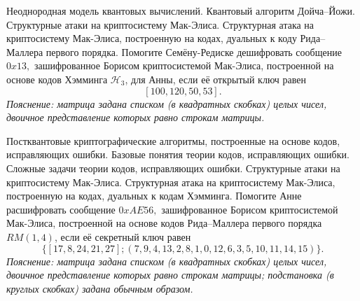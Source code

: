 \begin{questions}
    \question
        Неоднородная модель квантовых вычислений. Квантовый алгоритм Дойча--Йожи.
    \question
        Структурные атаки на криптосистему Мак-Элиса.
        Структурная атака на криптосистему Мак-Элиса, построенную на кодах, дуальных к коду Рида--Маллера первого порядка.
    \question
        Помогите Семёну-Редиске дешифровать сообщение \(0x13,\) зашифрованное Борисом криптосистемой Мак-Элиса, построенной на основе кодов Хэмминга \(\mathcal{H}_3\), для Анны, если её открытый ключ равен 
        \[[100, 120, 50, 53].\]
        \emph{Пояснение: матрица задана списком (в квадратных скобках) целых чисел, двоичное представление которых равно строкам матрицы.}
\end{questions}


\begin{questions}
    \question
        Постквантовые криптографические алгоритмы, построенные на основе кодов, исправляющих ошибки.
        Базовые понятия теории кодов, исправляющих ошибки.
        Сложные задачи теории кодов, исправляющих ошибки.
    \question
        Структурные атаки на криптосистему Мак-Элиса.
        Структурная атака на криптосистему Мак-Элиса, построенную на кодах, дуальных к кодам Хэмминга.
    \question
        Помогите Анне расшифровать сообщение \(0xAE56,\) зашифрованное Борисом криптосистемой Мак-Элиса, построенной на основе кодов Рида--Маллера первого порядка \(RM(1,4)\), если её секретный ключ равен \[\{[17, 8, 24, 21, 27]; (7, 9, 4, 13, 2, 8, 1, 0, 12, 6, 3, 5, 10, 11, 14, 15)\}.\]
        \emph{Пояснение: матрица задана списком (в квадратных скобках) целых чисел, двоичное представление которых равно строкам матрицы; подстановка (в круглых скобках) задана обычным образом.}
\end{questions}
